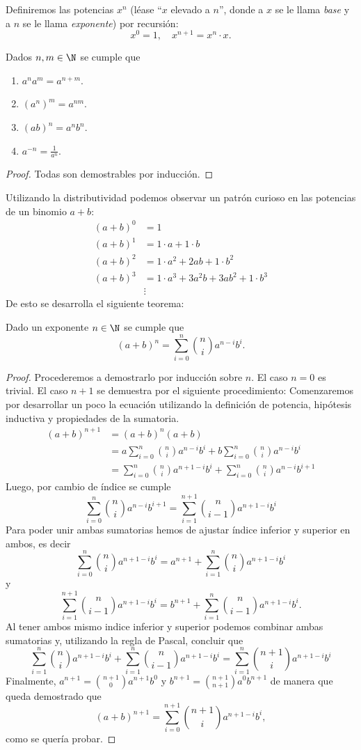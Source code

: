 \documentclass[11pt,oneside,a4paper]{book}
\begin{document}
Definiremos las potencias $x^n$ (léase ``$x$ elevado a $n$'', donde a $x$ se le llama \textit{base} y a $n$ se le llama \textit{exponente}) por recursión:
$$x^0=1,\quad x^{n+1}=x^n\cdot x.$$
\begin{thm}
Dados $n,m\in\N$ se cumple que
\begin{enumerate}[$a$)]
\item $a^{n}a^{m}=a^{n+m}$.
\item $(a^n)^m=a^{nm}$.
\item $(ab)^n=a^nb^n$.
\item $a^{-n}=\frac{1}{a^n}$.
\end{enumerate}
\end{thm}
\begin{proof}
Todas son demostrables por inducción.
\end{proof}
Utilizando la distributividad podemos observar un patrón curioso en las potencias de un binomio $a+b$:
\begin{align*}
(a+b)^0&=1\\
(a+b)^1&=1\cdot a+1\cdot b\\
(a+b)^2&=1\cdot a^2+2ab+1\cdot b^2\\
(a+b)^3&=1\cdot a^3+3a^2b+3ab^2+1\cdot b^3\\
&\vdots
\end{align*}
De esto se desarrolla el siguiente teorema:
\begin{thm}
Dado un exponente $n\in\N$ se cumple que
$$
(a+b)^n=\sum_{i=0}^n\binom{n}{i}a^{n-i}b^i.
$$
\end{thm}
\begin{proof}
Procederemos a demostrarlo por inducción sobre $n$. El caso $n=0$ es trivial. El caso $n+1$ se demuestra por el siguiente procedimiento: Comenzaremos por desarrollar un poco la ecuación utilizando la definición de potencia, hipótesis inductiva y propiedades de la sumatoria.
\begin{align*}
(a+b)^{n+1}&=(a+b)^n(a+b)\\
&=a\sum_{i=0}^n\binom{n}{i}a^{n-i}b^i+b\sum_{i=0}^n\binom{n}{i}a^{n-i}b^i\\
&=\sum_{i=0}^n\binom{n}{i}a^{n+1-i}b^i+\sum_{i=0}^n\binom{n}{i}a^{n-i}b^{i+1}
\end{align*}
Luego, por cambio de índice se cumple
$$\sum_{i=0}^n\binom{n}{i}a^{n-i}b^{i+1}=\sum_{i=1}^{n+1}\binom{n}{i-1}a^{n+1-i}b^i$$
Para poder unir ambas sumatorias hemos de ajustar índice inferior y superior en ambos, es decir
$$\sum_{i=0}^n\binom{n}{i}a^{n+1-i}b^i=a^{n+1}+\sum_{i=1}^n\binom{n}{i}a^{n+1-i}b^i$$
y
$$\sum_{i=1}^{n+1}\binom{n}{i-1}a^{n+1-i}b^i=b^{n+1}+\sum_{i=1}^n\binom{n}{i-1}a^{n+1-i}b^i.$$
Al tener ambos mismo indice inferior y superior podemos combinar ambas sumatorias y, utilizando la regla de Pascal, concluir que
$$\sum_{i=1}^n\binom{n}{i}a^{n+1-i}b^i+\sum_{i=1}^n\binom{n}{i-1}a^{n+1-i}b^i=\sum_{i=1}^n\binom{n+1}{i}a^{n+1-i}b^i$$
Finalmente, $a^{n+1}=\binom{n+1}{0}a^{n+1}b^0$ y $b^{n+1}=\binom{n+1}{n+1}a^0b^{n+1}$ de manera que queda demostrado que
$$(a+b)^{n+1}=\sum_{i=0}^{n+1}\binom{n+1}{i}a^{n+1-i}b^i,$$
como se quería probar.
\end{proof}
\end{document}
